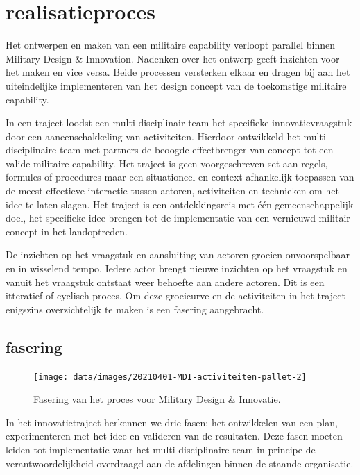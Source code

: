 \documentclass[
]{book}
\begin{document}
\hypertarget{realisatieproces}{%
\section{realisatieproces}\label{realisatieproces}}

Het ontwerpen en maken van een militaire capability verloopt parallel binnen Military Design \& Innovation. Nadenken over het ontwerp geeft inzichten voor het maken en vice versa. Beide processen versterken elkaar en dragen bij aan het uiteindelijke implementeren van het design concept van de toekomstige militaire capability.

In een traject loodst een multi-disciplinair team het specifieke innovatievraagstuk door een aaneenschakkeling van activiteiten. Hierdoor ontwikkeld het multi-disciplinaire team met partners de beoogde effectbrenger van concept tot een valide militaire capability. Het traject is geen voorgeschreven set aan regels, formules of procedures maar een situationeel en context afhankelijk toepassen van de meest effectieve interactie tussen actoren, activiteiten en technieken om het idee te laten slagen. Het traject is een ontdekkingsreis met één gemeenschappelijk doel, het specifieke idee brengen tot de implementatie van een vernieuwd militair concept in het landoptreden.

De inzichten op het vraagstuk en aansluiting van actoren groeien onvoorspelbaar en in wisselend tempo. Iedere actor brengt nieuwe inzichten op het vraagstuk en vanuit het vraagstuk ontstaat weer behoefte aan andere actoren. Dit is een itteratief of cyclisch proces. Om deze groeicurve en de activiteiten in het traject enigszins overzichtelijk te maken is een fasering aangebracht.

\hypertarget{fasering}{%
\subsection{fasering}\label{fasering}}

\begin{figure}

{\centering \texttt{[image: data/images/20210401-MDI-activiteiten-pallet-2]} 

}

\caption{Fasering van het proces voor Military Design \& Innovatie.}\label{fig:unnamed-chunk-11}
\end{figure}

In het innovatietraject herkennen we drie fasen; het ontwikkelen van een plan, experimenteren met het idee en valideren van de resultaten. Deze fasen moeten leiden tot implementatie waar het multi-disciplinaire team in principe de verantwoordelijkheid overdraagd aan de afdelingen binnen de staande organisatie.
\end{document}
